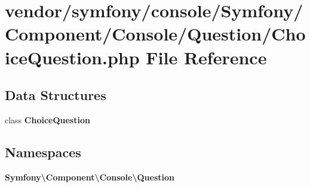 \section{vendor/symfony/console/\+Symfony/\+Component/\+Console/\+Question/\+Choice\+Question.php File Reference}
\label{_choice_question_8php}
\subsection*{Data Structures}
\begin{DoxyCompactItemize}
\item 
class {\bf Choice\+Question}
\end{DoxyCompactItemize}
\subsection*{Namespaces}
\begin{DoxyCompactItemize}
\item 
 {\bf Symfony\textbackslash{}\+Component\textbackslash{}\+Console\textbackslash{}\+Question}
\end{DoxyCompactItemize}
